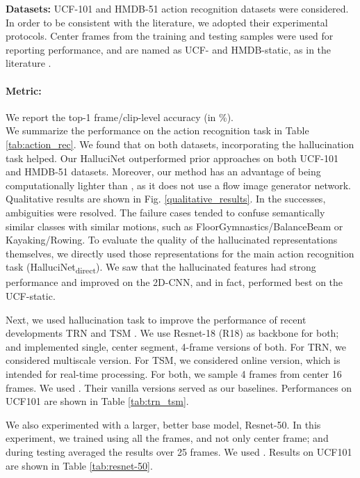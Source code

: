 \documentclass[10pt,twocolumn,letterpaper]{article}
\begin{document}
\noindent\textbf{Datasets:} UCF-101 \cite{ucf101} and HMDB-51 \cite{hmdb51} action recognition datasets were considered. In order to be consistent with the literature, we adopted their experimental protocols. Center frames from the training and testing samples were used for reporting performance, and are named as UCF- and HMDB-static, as in the literature \cite{im2flow}.

\paragraph{Metric:} We report the top-1 frame/clip-level accuracy (in \%). \\

We summarize the performance on the action recognition task in Table \ref{tab:action_rec}. We found that on both datasets, incorporating the hallucination task helped. Our HalluciNet outperformed prior approaches \cite{walker, im2flow} on both UCF-101 and HMDB-51 datasets. Moreover, our method has an advantage of being computationally lighter than \cite{im2flow}, as it does not use a flow image generator network. Qualitative results are shown in Fig. \ref{qualitative_results}. In the successes, ambiguities were resolved. The failure cases tended to confuse semantically similar classes with similar motions, such as FloorGymnastics/BalanceBeam or Kayaking/Rowing. To evaluate the quality of the hallucinated representations themselves, we directly used those representations for the main action recognition task (HalluciNet\textsubscript{direct}).  We saw that the hallucinated features had strong performance and improved on the 2D-CNN, and in fact, performed best on the UCF-static.

Next, we used hallucination task to improve the performance of recent developments TRN \cite{trn} and TSM \cite{tsm}. We use Resnet-18 (R18) as backbone for both; and implemented single, center segment, 4-frame versions of both. For TRN, we considered multiscale version. For TSM, we considered online version, which is intended for real-time processing. For both, we sample 4 frames from center 16 frames. We used . Their vanilla versions served as our baselines. Performances on UCF101 are shown in Table \ref{tab:trn_tsm}.

We also experimented with a larger, better base model, Resnet-50. In this experiment, we trained using all the frames, and not only center frame; and during testing averaged the results over 25 frames. We used . Results on UCF101 are shown in Table \ref{tab:resnet-50}.
\end{document}
